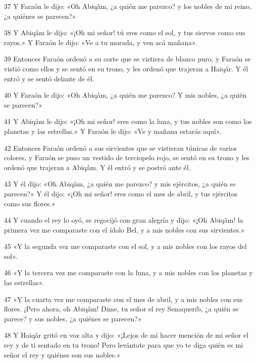 \par 37 Y Faraón le dijo: «Oh Abiqâm, ¿a quién me parezco? y los nobles de mi reino, ¿a quiénes se parecen?»

\par 38 Y Abiqâm le dijo: «¡Oh mi señor! tú eres como el sol, y tus siervos como sus rayos.» Y Faraón le dijo: «Ve a tu morada, y ven acá mañana».

\par 39 Entonces Faraón ordenó a su corte que se vistiera de blanco puro, y Faraón se vistió como ellos y se sentó en su trono, y les ordenó que trajeran a Haiqâr. Y él entró y se sentó delante de él.

\par 40 Y Faraón le dijo: «Oh Abiqâm, ¿a quién me parezco? Y mis nobles, ¿a quién se parecen?»

\par 41 Y Abiqâm le dijo: «¡Oh mi señor! eres como la luna, y tus nobles son como los planetas y las estrellas.» Y Faraón le dijo: «Ve y mañana estarás aquí».

\par 42 Entonces Faraón ordenó a sus sirvientes que se vistieran túnicas de varios colores, y Faraón se puso un vestido de terciopelo rojo, se sentó en su trono y les ordenó que trajeran a Abiqâm. Y él entró y se postró ante él.

\par 43 Y él dijo: «Oh Abiqâm, ¿a quién me parezco? y mis ejércitos, ¿a quién se parecen?» Y él dijo: «¡Oh mi señor! eres como el mes de abril, y tus ejércitos como sus flores.»

\par 44 Y cuando el rey lo oyó, se regocijó con gran alegría y dijo: «¡Oh Abiqâm! la primera vez me comparaste con el ídolo Bel, y a mis nobles con sus sirvientes.»

\par 45 «Y la segunda vez me comparaste con el sol, y a mis nobles con los rayos del sol».

\par 46 «Y la tercera vez me comparaste con la luna, y a mis nobles con los planetas y las estrellas».

\par 47 «Y la cuarta vez me comparaste con el mes de abril, y a mis nobles con sus flores. ¡Pero ahora, oh Abiqâm! Dime, tu señor el rey Senaquerib, ¿a quién se parece? y sus nobles, ¿a quiénes se parecen?»

\par 48 Y Haiqâr gritó en voz alta y dijo: «¡Lejos de mí hacer mención de mi señor el rey y de ti sentado en tu trono! Pero levántate para que yo te diga quién es mi señor el rey y quiénes son sus nobles.»

